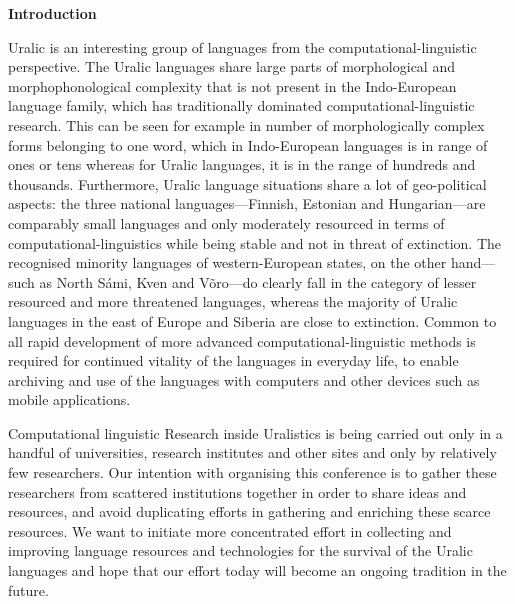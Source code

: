 \documentclass[11pt]{article}
\begin{document}
\begin{center}
  {\Large \bf Introduction}
\end{center}

\vspace*{0.5cm}


Uralic is an interesting group of languages from the
computational-linguistic perspective.  The Uralic languages share large
parts of morphological and morphophonological complexity that is not present in
the Indo-European language family, which has traditionally dominated
computational-linguistic research.  This can be seen for example in number of
morphologically complex forms belonging to one word, which in Indo-European
languages is in range of ones or tens whereas for Uralic languages, it is in the
range of hundreds and thousands.  Furthermore, Uralic language situations share
a lot of geo-political aspects: the three national languages---Finnish, Estonian
and Hungarian---are comparably small languages and only moderately resourced in
terms of computational-linguistics while being stable and not in threat of
extinction. The recognised minority languages of western-European states, on the
other hand---such as North S\'{a}mi, Kven and V\~{o}ro---do clearly fall in the category
of lesser resourced and more threatened languages, whereas the majority of
Uralic languages in the east of Europe and Siberia are close to extinction.
Common to all rapid development of more advanced computational-linguistic
methods is required for continued vitality of the languages in everyday life, to
enable archiving and use of the languages with computers and other devices such
as mobile applications.

Computational linguistic Research inside Uralistics is being carried out only in
a handful of universities, research institutes and other sites and only by
relatively few researchers.  Our intention with organising this conference is to
gather these researchers from scattered institutions together in order to share
ideas and resources, and avoid duplicating efforts in gathering and enriching
these scarce resources. We want to initiate more concentrated effort in
collecting and improving language resources and technologies for the survival of
the Uralic languages and hope that our effort today will become an ongoing
tradition in the future.
\end{document}
